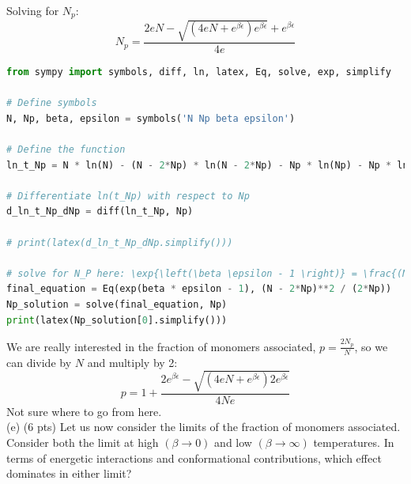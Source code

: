 \documentclass[12pt]{article}
\begin{document}
Solving for $N_p$:
\begin{equation}
  N_p = \frac{2 e N - \sqrt{\left(4 e N + e^{\beta \epsilon}\right) e^{\beta \epsilon}} + e^{\beta \epsilon}}{4 e}
\end{equation}
\begin{lstlisting}[language=Python]
from sympy import symbols, diff, ln, latex, Eq, solve, exp, simplify

# Define symbols
N, Np, beta, epsilon = symbols('N Np beta epsilon')

# Define the function
ln_t_Np = N * ln(N) - (N - 2*Np) * ln(N - 2*Np) - Np * ln(Np) - Np * ln(2) - beta * epsilon * Np

# Differentiate ln(t_Np) with respect to Np
d_ln_t_Np_dNp = diff(ln_t_Np, Np)

# print(latex(d_ln_t_Np_dNp.simplify()))

# solve for N_P here: \exp{\left(\beta \epsilon - 1 \right)} = \frac{(N - 2 N_p)^2}{2N_p}
final_equation = Eq(exp(beta * epsilon - 1), (N - 2*Np)**2 / (2*Np))
Np_solution = solve(final_equation, Np)
print(latex(Np_solution[0].simplify()))
\end{lstlisting}
We are really interested in the fraction of monomers associated, $p = \frac{2N_p}{N}$, so we can divide by $N$ and multiply by 2:
\begin{equation}
  p = 1 + \frac{2e^{\beta \epsilon} - \sqrt{\left(4 e N + e^{\beta \epsilon}\right) 2e^{\beta \epsilon}}}{4Ne}
\end{equation}
Not sure where to go from here.\\

(e) (6 pts) Let us now consider the limits of the fraction of monomers associated. Consider both the limit at high $(\beta \rightarrow 0)$ and low $(\beta \rightarrow \infty)$ temperatures. In terms of energetic interactions and conformational contributions, which effect dominates in either limit?
\end{document}

